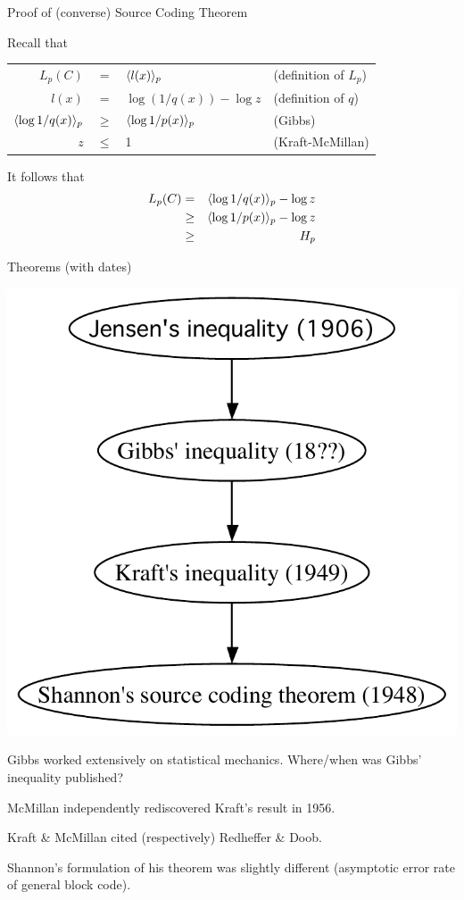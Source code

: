 \documentclass{beamer}
\begin{document}
\begin{frame}{Proof of (converse) Source Coding Theorem}

\itemb
\item Recall that
\begin{tabular}{rcll}
$L_p(C)$ & = & $\langle l(x) \rangle_p$ & (definition of $L_p$) \\
$l(x)$ & = & $\log(1/q(x)) - \log z$ & (definition of $q$) \\
$\langle \log 1/q(x) \rangle_p$ & $\geq$ & $\langle \log 1/p(x) \rangle_p$ & (Gibbs) \\
$z$ & $\leq$ & 1 & (Kraft-McMillan)
\end{tabular}
\item It follows that
\begin{eqnarray*}
L_p(C) & = & \langle \log 1/q(x) \rangle_p - \log z \\
& \geq & \langle \log 1/p(x) \rangle_p - \log z \\
& \geq & H_p
\end{eqnarray*}
\iteme

\end{frame}

\begin{frame}{Theorems (with dates)}

 \centerline{ \includegraphics[height=.5\textheight]{theorems-dates.pdf} }

\itemb
\item Gibbs worked extensively on statistical mechanics. \alert{Where/when was Gibbs' inequality published?}
\item McMillan independently rediscovered Kraft's result in 1956.
\item Kraft \& McMillan cited (respectively) Redheffer \& Doob.
\item Shannon's formulation of his theorem was slightly different (asymptotic error rate of general block code).
\iteme

\end{frame}
\end{document}
